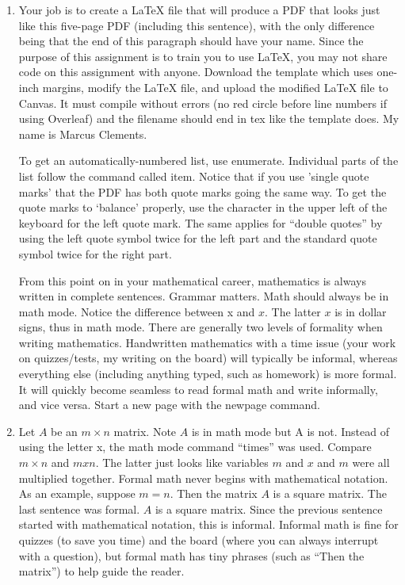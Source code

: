 \documentclass{article}
\begin{document}
\begin{enumerate}

\item Your job is to create a LaTeX file that will produce a PDF that looks just like this five-page PDF (including this sentence), with the only difference being that the end of this paragraph should have your name. Since the purpose of this assignment is to train you to use LaTeX, you may not share code on this assignment with anyone. Download the template which uses one-inch margins, modify the LaTeX file, and upload the modified LaTeX file to Canvas. It must compile without errors (no red circle before line numbers if using Overleaf) and the filename should end in tex like the template does. My name is Marcus Clements.

To get an automatically-numbered list, use enumerate. Individual parts of the list follow the command called item. Notice that if you use 'single quote marks' that the PDF has both quote marks going the same way. To get the quote marks to `balance' properly, use the character in the upper left of the keyboard for the left quote mark. The same applies for ``double quotes'' by using the left quote symbol twice for the left part and the standard quote symbol twice for the right part.

From this point on in your mathematical career, mathematics is always written in complete sentences. Grammar matters. Math should always be in math mode. Notice the difference between x and $x$. The latter $x$ is in dollar signs, thus in math mode. There are generally two levels of formality when writing mathematics. Handwritten mathematics with a time issue (your work on quizzes/tests, my writing on the board) will typically be informal, whereas everything else (including anything typed, such as homework) is more formal. It will quickly become seamless to read formal math and write informally, and vice versa. Start a new page with the newpage command.

\newpage

\item Let $A$ be an $m \times n$ matrix. Note $A$ is in math mode but A is not. Instead of using the letter x, the math mode command ``times'' was used. Compare $m \times n$ and $mxn$. The latter just looks like variables $m$ and $x$ and $m$ were all multiplied together. Formal math never begins with mathematical notation. As an example, suppose $m = n$. Then the matrix $A$ is a square matrix. The last sentence was formal. $A$ is a square matrix. Since the previous sentence started with mathematical notation, this is informal. Informal math is fine for quizzes (to save you time) and the board (where you can always interrupt with a question), but formal math has tiny phrases (such as ``Then the matrix'') to help guide the reader.


\end{enumerate}
\end{document}
